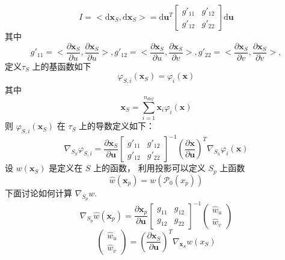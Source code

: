\documentclass{article}
\begin{document}
\begin{equation*}
I = <\mathrm d \mathbf x_S, \mathrm d \mathbf x_S> = \mathrm d \mathbf u^T 
\begin{bmatrix}
g'_{11} & g'_{12}\\
g'_{12} & g'_{22}
\end{bmatrix}
\mathrm d \mathbf u
\end{equation*}
其中 
\begin{equation*}
g'_{11} =<\frac{\partial \mathbf x_S}{\partial u}, \frac{\partial \mathbf x_S}{\partial u}>, 
g'_{12} =<\frac{\partial \mathbf x_S}{\partial u}, \frac{\partial \mathbf x_S}{\partial v}>, 
g'_{22} =<\frac{\partial \mathbf x_S}{\partial v}, \frac{\partial \mathbf x_S}{\partial v}>, 
\end{equation*}
定义$\tau_S$ 上的基函数如下
\begin{equation*}
\varphi_{S,i}(\mathbf x_S) =\varphi_{i}(\mathbf x) 
\end{equation*}
其中
\begin{equation*}
\mathbf x_S = \sum_{i=1}^{n_{dof}} \mathbf x_i \varphi_{i}(\mathbf x) 
\end{equation*}
则 $\varphi_{S,i}(\mathbf x_S)$ 在 $\tau_S$ 上的导数定义如下：
\begin{equation*}
\nabla_{S_S} \varphi_{S,i} = \frac{\partial \mathbf x_S}{\partial \mathbf u}\begin{bmatrix}
g'_{11} & g'_{12}\\
g'_{12} & g'_{22}
\end{bmatrix}^{-1}(\frac{\partial \mathbf x}{\partial \mathbf u})^T\nabla_{S_h}\varphi_{i}(\mathbf x) 
\end{equation*}
设 $w(\mathbf x_S)$ 是定义在 $S$ 上的函数， 利用投影可以定义 $S_p$ 上函数 
\begin{equation*}
\hat w(\mathbf x_p) = w(\mathcal P_0(x_p))
\end{equation*}
下面讨论如何计算 $\nabla_{S_p} w$. 
\begin{equation*}
\nabla_{S_p} \hat w(\mathbf x_p) = \frac{\partial \mathbf x_p}{\partial \mathbf u}\begin{bmatrix}
g_{11} & g_{12}\\
g_{12} & g_{22}
\end{bmatrix}^{-1}
\begin{pmatrix}
\hat w_u \\ \hat w_v
\end{pmatrix}
\end{equation*}
\begin{equation*}
\begin{pmatrix}
\hat w_u \\ \hat w_v
\end{pmatrix}
= (\frac{\partial \mathbf x_S}{\partial \mathbf u})^T \nabla_{\mathbf x_S} w(x_S)
\end{equation*}












\nocite{*}

\end{document}
